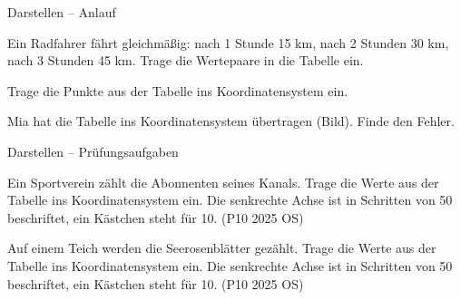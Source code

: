 \setcounter{aufgabe}{46}

\begin{aufgabe}{Darstellen – Anlauf}
\begin{teile}
\teil Ein Radfahrer fährt gleichmäßig: nach 1 Stunde 15 km, nach 2 Stunden 30 km, nach 3 Stunden 45 km. Trage die Wertepaare in die Tabelle ein.

\teil Trage die Punkte aus der Tabelle ins Koordinatensystem ein.

 \begin{ksys}[xmin=0,xmax=5,ymin=0,ymax=9,xlabel=Zeit in h,ylabel=Weg in km]\end{ksys}
\teil Mia hat die Tabelle ins Koordinatensystem übertragen (Bild). Finde den Fehler.

 \begin{ksys}[xmin=0,xmax=7,ymin=0,ymax=7,xlabel=Zeit in h,ylabel=Weg in km]\end{ksys}
\end{teile}
\end{aufgabe}

\begin{aufgabe}{Darstellen – Prüfungsaufgaben}
\begin{teile}
\teil Ein Sportverein zählt die Abonnenten seines Kanals. Trage die Werte aus der Tabelle ins Koordinatensystem ein. Die senkrechte Achse ist in Schritten von 50 beschriftet, ein Kästchen steht für 10. \hfill (P10 2025 OS)

 \begin{ksys}[xmin=0,xmax=5,ymin=0,ymax=300,ystep=50,xlabel=Zeit in Monaten,ylabel=Abonnenten]\end{ksys}
\teil Auf einem Teich werden die Seerosenblätter gezählt. Trage die Werte aus der Tabelle ins Koordinatensystem ein. Die senkrechte Achse ist in Schritten von 50 beschriftet, ein Kästchen steht für 10. \hfill (P10 2025 OS)

 \begin{ksys}[xmin=0,xmax=5,ymin=0,ymax=200,ystep=50,xlabel=Zeit in Wochen,ylabel=Blätter]\end{ksys}
\end{teile}
\end{aufgabe}

